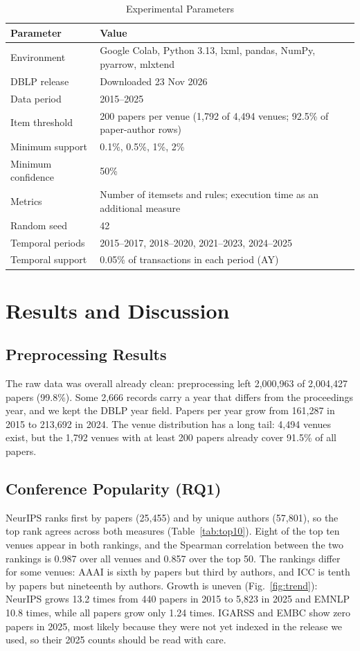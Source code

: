 ﻿\documentclass[conference]{IEEEtran}
\begin{document}
\begin{table}[t]
\caption{Experimental Parameters}
\label{tab:params}
\centering
\footnotesize
\begin{tabular}{p{2.4cm}p{5.0cm}}
\toprule
Parameter & Value \\
\midrule
Environment & Google Colab, Python 3.13, lxml, pandas, NumPy, pyarrow, mlxtend \\
DBLP release & Downloaded 23 Nov 2026 \\
Data period & 2015--2025 \\
Item threshold & 200 papers per venue (1,792 of 4,494 venues; 92.5\% of paper-author rows) \\
Minimum support & 0.1\%, 0.5\%, 1\%, 2\% \\
Minimum confidence & 50\% \\
Metrics & Number of itemsets and rules; execution time as an additional measure \\
Random seed & 42 \\
Temporal periods & 2015--2017, 2018--2020, 2021--2023, 2024--2025 \\
Temporal support & 0.05\% of transactions in each period (AY) \\
\bottomrule
\end{tabular}
\end{table}

\section{Results and Discussion}
\subsection{Preprocessing Results}
The raw data was overall already clean: preprocessing left 2,000,963 of 2,004,427 papers (99.8\%). Some 2,666 records carry a year that differs from the proceedings year, and we kept the DBLP year field. Papers per year grow from 161,287 in 2015 to 213,692 in 2024. The venue distribution has a long tail: 4,494 venues exist, but the 1,792 venues with at least 200 papers already cover 91.5\% of all papers.

\subsection{Conference Popularity (RQ1)}
NeurIPS ranks first by papers (25,455) and by unique authors (57,801), so the top rank agrees across both measures (Table~\ref{tab:top10}). Eight of the top ten venues appear in both rankings, and the Spearman correlation between the two rankings is 0.987 over all venues and 0.857 over the top 50. The rankings differ for some venues: AAAI is sixth by papers but third by authors, and ICC is tenth by papers but nineteenth by authors. Growth is uneven (Fig.~\ref{fig:trend}): NeurIPS grows 13.2 times from 440 papers in 2015 to 5,823 in 2025 and EMNLP 10.8 times, while all papers grow only 1.24 times. IGARSS and EMBC show zero papers in 2025, most likely because they were not yet indexed in the release we used, so their 2025 counts should be read with care.
\end{document}
